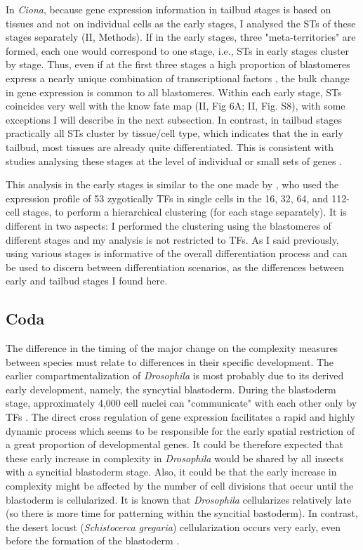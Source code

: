 In \textit{Ciona}, because gene expression information in tailbud stages is based on tissues and not on individual cells as the early stages, I analysed the STs of these stages separately (II, Methods). 
%
If in the early stages, three "meta-territories" are formed, each one would correspond to one stage, i.e., STs in early stages cluster by stage.
Thus, even if at the first three stages a high proportion of blastomeres express a nearly unique combination of transcriptional factors \citep{Imai2006}, the bulk change in gene expression is common to all blastomeres. Within each early stage, STs coincides very well with the know fate map (II, Fig 6A; II, Fig. S8), with some exceptions I will describe in the next subsection.
%
In contrast, in tailbud stages practically all STs cluster by tissue/cell type, which indicates that the in early tailbud, most tissues are already quite differentiated.
This is consistent with studies analysing these stages at the level of individual or small sets of genes \citep{Corbo1997,DiGregorio1999}.

This analysis in the early stages is similar to the one made by \citet{Imai2006}, who used the expression profile of 53 zygotically TFs in single cells in the 16, 32, 64, and 112-cell stages, to perform a hierarchical clustering (for each stage separately). 
It is different in two aspects: I performed the clustering using the blastomeres of different stages and my analysis is not restricted to TFs. As I said previously, using various stages is informative of the overall differentiation process and can be used to discern between differentiation scenarios, as the differences between early and tailbud stages I found here.


\subsection{Coda}

The difference in the timing of the major change on the complexity measures between species must relate to differences in their specific development.
The earlier compartmentalization of \textit{Drosophila} is most probably due to its derived early development, namely, the syncytial blastoderm. 
During the blastoderm stage, approximately 4,000 cell nuclei can "communicate" with each other only by TFs \citep{Jaeger2011}. The direct cross regulation of gene expression facilitates a rapid and highly dynamic process which seems to be responsible for the early spatial restriction of a great proportion of developmental genes.
It could be therefore expected that these early increase in complexity in \textit{Drosophila} would be shared by all insects with a syncitial blastoderm stage. Also, it could be that the early increase in complexity might be affected by the number of cell divisions that occur until the blastoderm is cellularized. It is known that \textit{Drosophila} cellularizes relatively late (so there is more time for patterning within the syncitial bastoderm). In contrast, the desert locust (\textit{Schistocerca gregaria}) cellularization occurs very early, even before the formation of the blastoderm \citep{Ho1997}.

